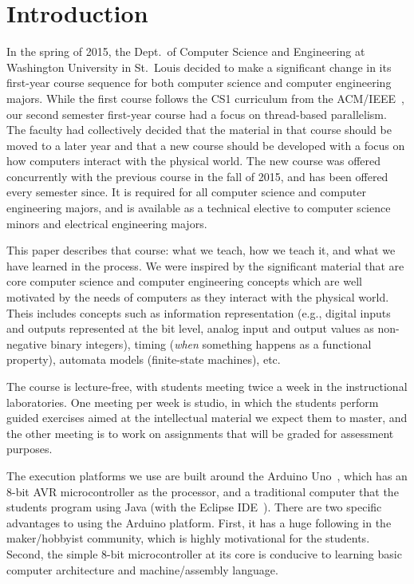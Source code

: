 \section{Introduction}
\label{sec:intro}

In the spring of 2015, the Dept.~of Computer Science and Engineering at
Washington University in St.~Louis decided to make a significant change
in its first-year course sequence for both computer science and
computer engineering majors.  While the first course follows
the CS1 curriculum from the ACM/IEEE~\cite{cs13}, our second semester
first-year course had a focus on thread-based parallelism.  The faculty
had collectively decided that the material in that course should be moved
to a later year and that a new course should be developed with a focus on 
how computers interact with the physical world.
The new course was offered concurrently with the previous course in the
fall of 2015, and has been offered every semester since.
It is required for all computer science and computer engineering majors,
and is available as a technical elective to computer science minors and electrical
engineering majors.

This paper describes that course: what we teach, how we teach it, and
what we have learned in the process.
We were inspired by the significant material that are core
computer science and computer engineering concepts which are well motivated
by the needs of computers as they interact with the physical world.
Theis includes concepts such as information representation (e.g., digital inputs
and outputs represented at the bit level, analog input and output values as
non-negative binary integers),
timing (\emph{when} something happens as a functional property),
automata models (finite-state machines), etc.

The course is lecture-free, with students meeting twice a week in the
instructional laboratories.  One meeting per week is studio, in which the
students perform guided exercises aimed at the intellectual material we
expect them to master, and the other meeting is to work on assignments
that will be graded for assessment purposes.

The execution platforms we use are built around the Arduino Uno~\cite{arduino},
which has an 8-bit AVR microcontroller as the processor,
and a traditional computer that the
students program using Java (with the Eclipse IDE~\cite{eclipse}).
There are two specific advantages to using the Arduino platform.
First, it has a huge following in the maker/hobbyist community, which
is highly motivational for the students. 
Second, the simple 8-bit microcontroller at its core is conducive to
learning basic computer architecture and machine/assembly language.

